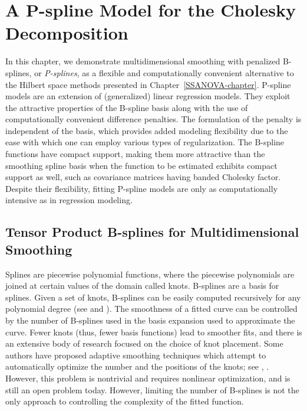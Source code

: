 
\chapter{A P-spline Model for the Cholesky Decomposition} \label{psplines-chapter}



In this chapter, we demonstrate multidimensional smoothing with penalized B-splines, or \textit{P-splines}, as a flexible and computationally convenient alternative to the Hilbert space methods presented in Chapter~\ref{SSANOVA-chapter}. P-spline models are an extension of (generalized) linear regression models. They exploit the attractive properties of the B-spline basis along with the use of computationally convenient difference penalties. The formulation of the penalty is independent of the basis, which provides added modeling flexibility due to the ease with which one can employ various types of regularization. The B-spline functions have compact support, making them more attractive than the smoothing spline basis when the function to be estimated exhibits compact support as well, such as covariance matrices having banded Cholesky factor. Despite their flexibility, fitting P-spline models are only as computationally intensive as in regression modeling.  

\section{Tensor Product B-splines for Multidimensional Smoothing}

Splines are piecewise polynomial functions, where the piecewise polynomials are joined at certain values of the domain called knots. B-splines are a basis for splines. Given a set of knots, B-splines can be easily computed recursively for any polynomial degree (see \cite{de1978practical} and \cite{dierckx1995curve}). The smoothness of a fitted curve can be controlled by the number of B-splines used in the basis expansion used to approximate the curve. Fewer knots (thus, fewer basis functions) lead to smoother fits, and there is an extensive body of research focused on the choice of knot placement. Some authors have proposed adaptive smoothing techniques which attempt to automatically optimize the number and the positions of the knots; see \cite{friedman1989flexible}, \cite{kooperberg1991study}. However, this problem is nontrivial and requires nonlinear optimization, and is still an open problem today. However, limiting the number of B-splines is not the only approach to controlling the complexity of the fitted function.

